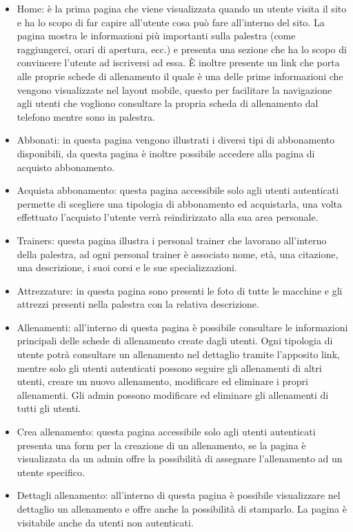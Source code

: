 \documentclass[a4paper]{article}
\begin{document}
	\begin{itemize}
		\item Home: è la prima pagina che viene visualizzata quando un utente visita il sito e ha lo scopo di far capire all'utente cosa può fare all'interno del sito. La pagina mostra le informazioni più importanti sulla palestra (come raggiungerci, orari di apertura, ecc.) e presenta una sezione che ha lo scopo di convincere l'utente ad iscriversi ad essa. È inoltre presente un link che porta alle proprie schede di allenamento il quale è una delle prime informazioni che vengono visualizzate nel layout mobile, questo per facilitare la navigazione agli utenti che vogliono consultare la propria scheda di allenamento dal telefono mentre sono in palestra.
		\item Abbonati: in questa pagina vengono illustrati i diversi tipi di abbonamento disponibili, da questa pagina è inoltre possibile accedere alla pagina di acquisto abbonamento.
		\item Acquista abbonamento: questa pagina accessibile solo agli utenti autenticati permette di scegliere una tipologia di abbonamento ed acquistarla, una volta effettuato l'acquisto l'utente verrà reindirizzato alla sua area personale.
		\item Trainers: questa pagina illustra i personal trainer che lavorano all'interno della palestra, ad ogni personal trainer è associato nome, età, una citazione, una descrizione, i suoi corsi e le sue specializzazioni.
		\item Attrezzature: in questa pagina sono presenti le foto di tutte le macchine e gli attrezzi presenti nella palestra con la relativa descrizione.
		\item Allenamenti: all'interno di questa pagina è possibile consultare le informazioni principali delle schede di allenamento create dagli utenti. Ogni tipologia di utente potrà consultare un allenamento nel dettaglio tramite l'apposito link, mentre solo gli utenti autenticati possono seguire gli allenamenti di altri utenti, creare un nuovo allenamento, modificare ed eliminare i propri allenamenti. Gli admin possono modificare ed eliminare gli allenamenti di tutti gli utenti.
		\item Crea allenamento: questa pagina accessibile solo agli utenti autenticati presenta una form per la creazione di un allenamento, se la pagina è visualizzata da un admin offre la possibilità di assegnare l'allenamento ad un utente specifico.
		\item Dettagli allenamento: all'interno di questa pagina è possibile visualizzare nel dettaglio un allenamento e offre anche la possibilità di stamparlo. La pagina è visitabile anche da utenti non autenticati.

\end{itemize}
\end{document}
